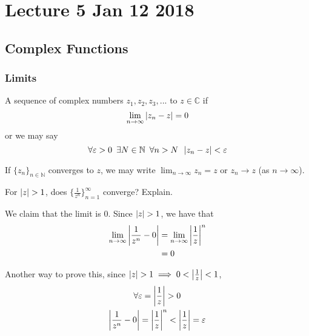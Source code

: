 \documentclass[11pt, oneside]{book}
\begin{document}


\chapter{Lecture 5 Jan 12 2018}
	\label{chapter:lecture_5_jan_12_2018}

\section{Complex Functions} %
\label{sec:complex_functions}

\subsection{Limits} %
\label{sub:limits}

\begin{defn}[Convergence]\label{defn:Convergence}
	A sequence of complex numbers $z_1, z_2, z_3, ...$  to $z \in \mathbb{C}$ if
	\begin{equation}
		\lim_{n \to \infty} \left|z_n - z\right| = 0
	\end{equation}
	or we may say
	\begin{equation}
		\forall \varepsilon > 0 \enspace \exists N \in \mathbb{N} \enspace \forall n > N \enspace \left|z_n - z\right| < \varepsilon
	\end{equation}
\end{defn}

\begin{note}
 If $\{z_n\}_{n \in \mathbb{N}}$ converges to $z$, we may write $\lim_{n \to \infty} z_n = z$ or $z_n \to z$ (as $n \to \infty$).
\end{note}

\begin{eg}
	For $\left|z\right| > 1$, does $\{\frac{1}{z^n}\}^\infty_{n = 1}$ converge? Explain.

	\begin{solution}
		We claim that the limit is 0. Since $\left|z\right| > 1$, we have that
		\begin{align*}
			\lim_{n \to \infty} \left|\frac{1}{z^n} - 0\right|
				&= \lim_{n \to \infty} \left|\frac{1}{z}\right|^n \\
				&= 0
		\end{align*}

		Another way to prove this, since $\left|z\right| > 1 \implies 0 < \left|\frac{1}{z}\right| < 1$,
		\begin{gather*}
			\forall \varepsilon = \left|\frac{1}{z}\right| > 0 \\
			\left|\frac{1}{z^n} - 0\right| = \left|\frac{1}{z}\right|^n < \left|\frac{1}{z}\right| = \varepsilon
		\end{gather*}
	\end{solution}
\end{eg}
\end{document}
